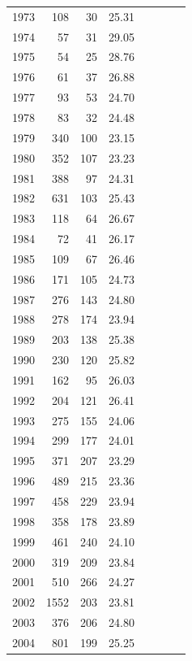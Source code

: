 \documentclass[12pt,]{article}
\begin{document}
\begin{table}[ht]
\begin{tabular}{rrrrllll}
  1973 & 108 &  30 & 25.31 &  &  &  &  \\ 
  1974 &  57 &  31 & 29.05 &  &  &  &  \\ 
  1975 &  54 &  25 & 28.76 &  &  &  &  \\ 
  1976 &  61 &  37 & 26.88 &  &  &  &  \\ 
  1977 &  93 &  53 & 24.70 &  &  &  &  \\ 
  1978 &  83 &  32 & 24.48 &  &  &  &  \\ 
  1979 & 340 & 100 & 23.15 &  &  &  &  \\ 
  1980 & 352 & 107 & 23.23 &  &  &  &  \\ 
  1981 & 388 &  97 & 24.31 &  &  &  &  \\ 
  1982 & 631 & 103 & 25.43 &  &  &  &  \\ 
  1983 & 118 &  64 & 26.67 &  &  &  &  \\ 
  1984 &  72 &  41 & 26.17 &  &  &  &  \\ 
  1985 & 109 &  67 & 26.46 &  &  &  &  \\ 
  1986 & 171 & 105 & 24.73 &  &  &  &  \\ 
  1987 & 276 & 143 & 24.80 &  &  &  &  \\ 
  1988 & 278 & 174 & 23.94 &  &  &  &  \\ 
  1989 & 203 & 138 & 25.38 &  &  &  &  \\ 
  1990 & 230 & 120 & 25.82 &  &  &  &  \\ 
  1991 & 162 &  95 & 26.03 &  &  &  &  \\ 
  1992 & 204 & 121 & 26.41 &  &  &  &  \\ 
  1993 & 275 & 155 & 24.06 &  &  &  &  \\ 
  1994 & 299 & 177 & 24.01 &  &  &  &  \\ 
  1995 & 371 & 207 & 23.29 &  &  &  &  \\ 
  1996 & 489 & 215 & 23.36 &  &  &  &  \\ 
  1997 & 458 & 229 & 23.94 &  &  &  &  \\ 
  1998 & 358 & 178 & 23.89 &  &  &  &  \\ 
  1999 & 461 & 240 & 24.10 &  &  &  &  \\ 
  2000 & 319 & 209 & 23.84 &  &  &  &  \\ 
  2001 & 510 & 266 & 24.27 &  &  &  &  \\ 
  2002 & 1552 & 203 & 23.81 &  &  &  &  \\ 
  2003 & 376 & 206 & 24.80 &  &  &  &  \\ 
  2004 & 801 & 199 & 25.25 &  &  &  &  \\ 

\end{tabular}
\end{table}
\end{document}
